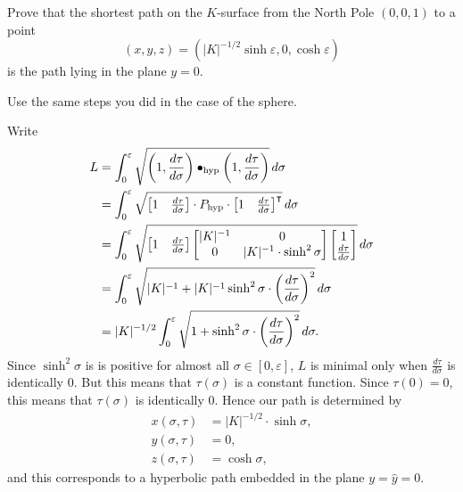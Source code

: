 \documentclass[newpage,hints,,12pt,noauthor,nooutcomes,handout]{ximera}
\begin{document}
\begin{problem}
  Prove that the shortest path on the $K$-surface from the North Pole
  $(0,0,1)$ to a point
  \[
  (x,y,z)=\left(|K|^{-1/2}\sinh \varepsilon,0,\cosh \varepsilon\right)
  \]
  is the path lying in the plane $y=0$.
  \begin{hint}
    Use the same steps you did in the case of the sphere.
  \end{hint}

  \begin{freeResponse}
    Write
    \begin{align*}
    L  &=\int_{0}^{\varepsilon} \sqrt{\left(1,\dd[\tau]{\sigma}\right)\bullet_\mathrm{hyp} \left(1,\dd[\tau]{\sigma}\right)}\d\sigma\\
    &= \int_{0}^{\varepsilon} \sqrt{
      \begin{bmatrix} 1 & \dd[\tau]{\sigma}
      \end{bmatrix} \cdot P_\mathrm{hyp}\cdot
      \begin{bmatrix} 1 & \dd[\tau]{\sigma}
      \end{bmatrix}^\transpose}\d\sigma \\
    &= \int_{0}^{\varepsilon} \sqrt{
      \begin{bmatrix} 1 & \dd[\tau]{\sigma}
      \end{bmatrix}
      \begin{bmatrix}
        |K|^{-1} & 0 \\
        0 & |K|^{-1}\cdot\sinh^2 \sigma
      \end{bmatrix}
      \begin{bmatrix} 1 \\ \dd[\tau]{\sigma}
    \end{bmatrix}}\d\sigma \\
    &= \int_{0}^{\varepsilon} \sqrt{
      |K|^{-1}+|K|^{-1}\sinh^{2}\sigma\cdot \left(\frac{d\tau }{d\sigma}\right)^{2}
    }\d\sigma \\
    &= |K|^{-1/2}\int_{0}^{\varepsilon} \sqrt{
      1+\sinh^{2}\sigma\cdot \left(\frac{d\tau }{d\sigma}\right)^{2}
    }\d\sigma.
    \end{align*}
   Since $\sinh^{2}\sigma$ is is positive for almost all $\sigma\in[
     0,\varepsilon] $, $L$ is minimal only when
   $\frac{d\tau}{d\sigma}$ is identically $0$. But this means that
   $\tau\left( \sigma\right) $ is a constant function. Since
   $\tau\left( 0\right) =0$, this means that $\tau\left( \sigma\right)
   $ is identically $0$. Hence our path is determined by
   \begin{align*}
     x(\sigma,\tau) &=|K|^{-1/2}\cdot \sinh\sigma,\\
     y(\sigma,\tau) &=0,\\
     z(\sigma,\tau) &=\cosh \sigma,
   \end{align*}
   and this corresponds to a hyperbolic path embedded in the plane
   $y=\hat{y}=0$.
  \end{freeResponse}

\end{problem}
\end{document}

